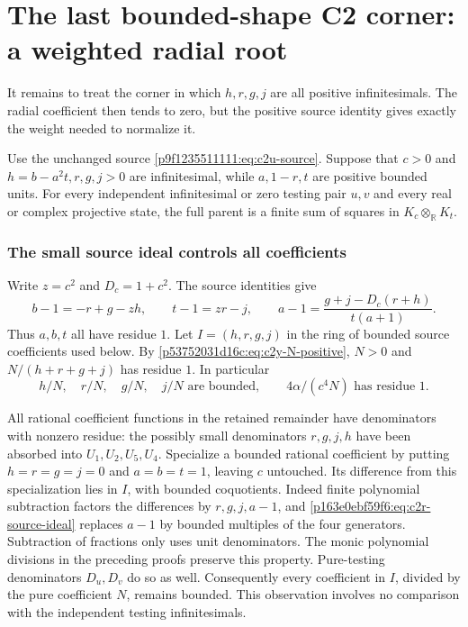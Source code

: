 \section{\texorpdfstring{The last bounded-shape C2 corner: a weighted radial root}{The last bounded-shape C2 corner: a weighted radial root}}
\label{component:p163e0ebf59f6}

\label{p163e0ebf59f6:sec:c2-radial-corner}

It remains to treat the corner in which $h,r,g,j$ are all positive
infinitesimals.  The radial coefficient then tends to zero, but the
positive source identity gives exactly the weight needed to normalize it.

\begin{theorem}
\label{p163e0ebf59f6:thm:c2-radial-corner}
Use the unchanged source \eqref{p9f1235511111:eq:c2u-source}.  Suppose that $c>0$ and
$h=b-a^2t,r,g,j>0$ are infinitesimal, while $a,1-r,t$ are positive
bounded units.  For every independent infinitesimal or zero testing pair
$u,v$ and every real or complex projective state, the full parent is a
finite sum of squares in $K_c\otimes_{\mathbb R}K_t$.
\end{theorem}

\subsubsection*{The small source ideal controls all coefficients}
Write $z=c^2$ and $D_c=1+c^2$.  The source identities give
\begin{equation}
b-1=-r+g-zh,\qquad t-1=zr-j,\qquad
a-1=\frac{g+j-D_c(r+h)}{t(a+1)}.
\label{p163e0ebf59f6:eq:c2r-source-ideal}
\end{equation}
Thus $a,b,t$ all have residue $1$.  Let $I=(h,r,g,j)$ in the ring of
bounded source coefficients used below.  By
\eqref{p53752031d16c:eq:c2y-N-positive}, $N>0$ and $N/(h+r+g+j)$ has residue $1$.
In particular
\begin{equation}
h/N,\quad r/N,\quad g/N,\quad j/N
\text{ are bounded},\qquad
4\alpha/(c^4N)\text{ has residue }1.
\label{p163e0ebf59f6:eq:c2r-weight-bounds}
\end{equation}

All rational coefficient functions in the retained remainder have
denominators with nonzero residue: the possibly small denominators
$r,g,j,h$ have been absorbed into $U_1,U_2,U_5,U_4$.  Specialize a
bounded rational coefficient by putting $h=r=g=j=0$ and $a=b=t=1$,
leaving $c$ untouched.  Its difference from this specialization lies in
$I$, with bounded coquotients.  Indeed finite polynomial subtraction
factors the differences by $r,g,j,a-1$, and
\eqref{p163e0ebf59f6:eq:c2r-source-ideal} replaces $a-1$ by bounded multiples of the
four generators.  Subtraction of fractions only uses unit denominators.
The monic polynomial divisions in the preceding proofs preserve this
property.  Pure-testing denominators $D_u,D_v$ do so as well.
Consequently every coefficient in $I$, divided by the pure coefficient
$N$, remains bounded.  This observation involves no comparison with
the independent testing infinitesimals.

